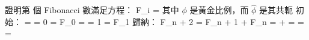 \startEXERCISE
證明第  個 Fibonacci 數滿足方程：
\startformula
F_i = 
\stopformula
其中 $\phi$ 是黃金比例，而 $\hat \phi$ 是其共軛
\stopEXERCISE
\startANSWER
初始：
\startsplitformula\startmathalignment
\NC {}
    \NC =  = 0 = F_0 \NR
\NC {}
    \NC =  = 1 = F_1 \NR
\stopmathalignment\stopsplitformula
歸納：
\startsplitformula\startmathalignment
 \NC F_{n + 2} \NC = F_{n + 1} + F_n \NR
 \NC \NC =  +  \NR
 \NC \NC =  \NR
 \NC \NC =  \NR
 \NC \NC =  \NR
\stopmathalignment\stopsplitformula
\stopANSWER

